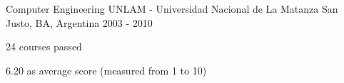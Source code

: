 


\begin{cventries}


	\cventry
	{Computer Engineering} %
	{UNLAM - Universidad Nacional de La Matanza} %
	{San Justo, BA, Argentina} %
	{2003 - 2010} %
	{ %
		\begin{cvitems}
			\item {24 courses passed}
			\item{6.20 as average score  (measured  from 1 to 10)}
		\end{cvitems}
	}


\end{cventries}
